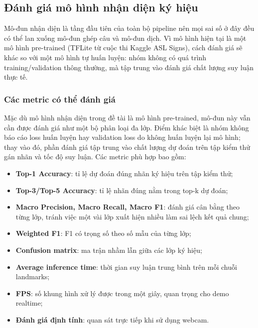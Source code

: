 ﻿\subsection{Đánh giá mô hình nhận diện ký hiệu}

Mô-đun nhận diện là tầng đầu tiên của toàn bộ pipeline nên mọi sai số ở đây đều có thể lan xuống mô-đun
ghép câu và mô-đun dịch. Vì mô hình hiện tại là một mô hình pre-trained (TFLite từ cuộc thi Kaggle
ASL Signs), cách đánh giá sẽ khác so với một mô hình tự huấn luyện: nhóm không có quá trình
training/validation thông thường, mà tập trung vào đánh giá chất lượng suy luận thực tế.

\subsubsection{Các metric có thể đánh giá}

Mặc dù mô hình nhận diện trong đề tài là mô hình pre-trained, mô-đun này vẫn cần được đánh giá như
một bộ phân loại đa lớp. Điểm khác biệt là nhóm không báo cáo loss huấn luyện hay validation loss do
không huấn luyện lại mô hình; thay vào đó, phần đánh giá tập trung vào chất lượng dự đoán trên tập
kiểm thử gán nhãn và tốc độ suy luận. Các metric phù hợp bao gồm:
\begin{itemize}
    \item \textbf{Top-1 Accuracy}: tỉ lệ dự đoán đúng nhãn ký hiệu trên tập kiểm thử;
    \item \textbf{Top-3/Top-5 Accuracy}: tỉ lệ nhãn đúng nằm trong top-k dự đoán;
    \item \textbf{Macro Precision, Macro Recall, Macro F1}: đánh giá cân bằng theo từng lớp, tránh việc
    một vài lớp xuất hiện nhiều làm sai lệch kết quả chung;
    \item \textbf{Weighted F1}: F1 có trọng số theo số mẫu của từng lớp;
    \item \textbf{Confusion matrix}: ma trận nhầm lẫn giữa các lớp ký hiệu;
    \item \textbf{Average inference time}: thời gian suy luận trung bình trên mỗi chuỗi landmarks;
    \item \textbf{FPS}: số khung hình xử lý được trong một giây, quan trọng cho demo realtime;
    \item \textbf{Đánh giá định tính}: quan sát trực tiếp khi sử dụng webcam.
\end{itemize}

